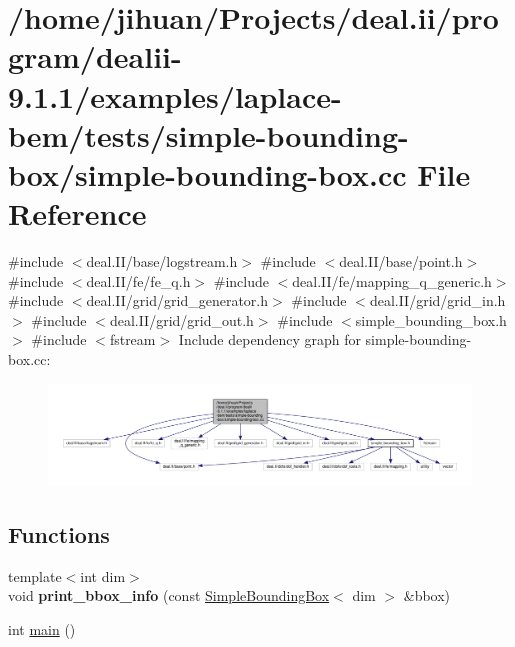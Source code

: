 \hypertarget{simple-bounding-box_8cc}{}\section{/home/jihuan/\+Projects/deal.ii/program/dealii-\/9.1.1/examples/laplace-\/bem/tests/simple-\/bounding-\/box/simple-\/bounding-\/box.cc File Reference}
\label{simple-bounding-box_8cc}
{\ttfamily \#include $<$deal.\+I\+I/base/logstream.\+h$>$}\newline
{\ttfamily \#include $<$deal.\+I\+I/base/point.\+h$>$}\newline
{\ttfamily \#include $<$deal.\+I\+I/fe/fe\+\_\+q.\+h$>$}\newline
{\ttfamily \#include $<$deal.\+I\+I/fe/mapping\+\_\+q\+\_\+generic.\+h$>$}\newline
{\ttfamily \#include $<$deal.\+I\+I/grid/grid\+\_\+generator.\+h$>$}\newline
{\ttfamily \#include $<$deal.\+I\+I/grid/grid\+\_\+in.\+h$>$}\newline
{\ttfamily \#include $<$deal.\+I\+I/grid/grid\+\_\+out.\+h$>$}\newline
{\ttfamily \#include $<$simple\+\_\+bounding\+\_\+box.\+h$>$}\newline
{\ttfamily \#include $<$fstream$>$}\newline
Include dependency graph for simple-\/bounding-\/box.cc\+:\nopagebreak
\begin{figure}[H]
\begin{center}
\leavevmode
\includegraphics[width=350pt]{simple-bounding-box_8cc__incl}
\end{center}
\end{figure}
\subsection*{Functions}
\begin{DoxyCompactItemize}
\item 
\mbox{\label{simple-bounding-box_8cc_aa1e1544709b9f7c30979d4da5e625057}} 
{\footnotesize template$<$int dim$>$ }\\void {\bfseries print\+\_\+bbox\+\_\+info} (const \hyperlink{classSimpleBoundingBox}{Simple\+Bounding\+Box}$<$ dim $>$ \&bbox)
\item 
int \hyperlink{simple-bounding-box_8cc_ae66f6b31b5ad750f1fe042a706a4e3d4}{main} ()
\end{DoxyCompactItemize}


